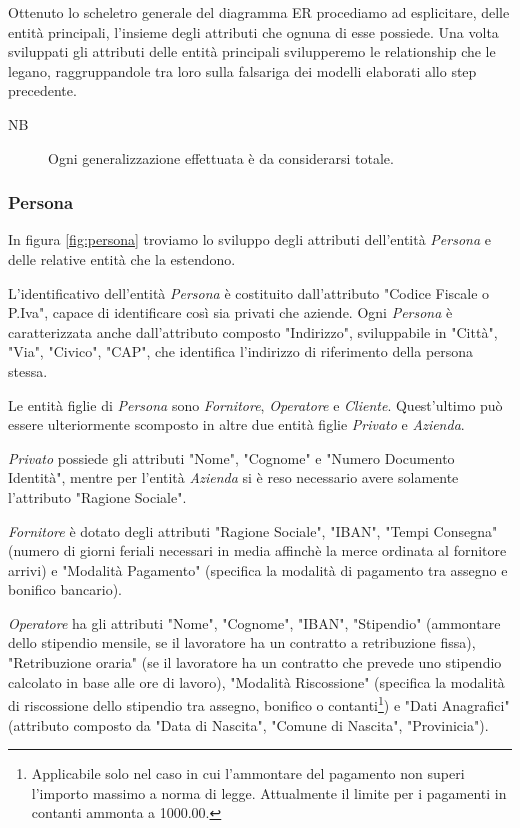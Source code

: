 		Ottenuto lo scheletro generale del diagramma ER procediamo ad esplicitare, delle entità principali, l'insieme degli attributi che ognuna di esse possiede.
		Una volta sviluppati gli attributi delle entità principali svilupperemo le relationship che le legano, raggruppandole tra loro sulla falsariga dei modelli elaborati allo step precedente.
		
		\begin{description}
			\item[NB]
				Ogni generalizzazione effettuata è da considerarsi totale.
		\end{description}
		
		\subsubsection{Persona}
		
			In figura \ref{fig:persona} troviamo lo sviluppo degli attributi dell'entità \emph{Persona} e delle relative entità che la estendono.
			
			L'identificativo dell'entità \emph{Persona} è costituito dall'attributo "Codice Fiscale o P.Iva", capace di identificare così sia privati che aziende. Ogni \emph{Persona} è caratterizzata anche dall'attributo composto "Indirizzo", sviluppabile in "Città", "Via", "Civico", "CAP", che identifica l'indirizzo di riferimento della persona stessa.
			
			Le entità figlie di \emph{Persona} sono \emph{Fornitore}, \emph{Operatore} e \emph{Cliente}. Quest'ultimo può essere ulteriormente scomposto in altre due entità figlie \emph{Privato} e \emph{Azienda}.
			
			\emph{Privato} possiede gli attributi "Nome", "Cognome" e "Numero Documento Identità", mentre per l'entità \emph{Azienda} si è reso necessario avere solamente l'attributo "Ragione Sociale".
			
			\emph{Fornitore} è dotato degli attributi "Ragione Sociale", "IBAN", "Tempi Consegna" (numero di giorni feriali necessari in media affinchè la merce ordinata al fornitore arrivi) e "Modalità Pagamento" (specifica la modalità di pagamento tra assegno e bonifico bancario).
			
			\emph{Operatore} ha gli attributi "Nome", "Cognome", "IBAN", "Stipendio" (ammontare dello stipendio mensile, se il lavoratore ha un contratto a retribuzione fissa), "Retribuzione oraria" (se il lavoratore ha un contratto che prevede uno stipendio calcolato in base alle ore di lavoro), "Modalità Riscossione" (specifica la modalità di riscossione dello stipendio tra assegno, bonifico o contanti\footnote{Applicabile solo nel caso in cui l'ammontare del pagamento non superi l'importo massimo a norma di legge. Attualmente il limite per i pagamenti in contanti ammonta a 1000.00\EUR.}) e "Dati Anagrafici" (attributo composto da "Data di Nascita", "Comune di Nascita", "Provinicia").
						
